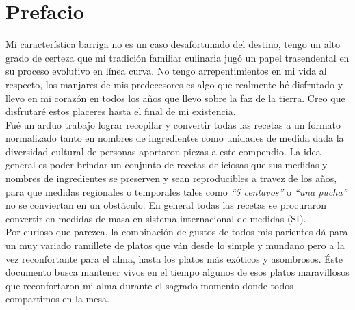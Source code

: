 \chapter{Prefacio}
Mi característica barriga no es un caso desafortunado del destino, tengo un alto grado de certeza que mi tradición familiar culinaria jugó un papel trasendental en su proceso evolutivo en línea curva. No tengo arrepentimientos en mi vida al respecto, los manjares de mis predecesores es algo que realmente hé disfrutado y llevo en mi corazón en todos los años que llevo sobre la faz de la tierra. Creo que disfrutaré estos placeres hasta el final de mi existencia.\\

Fué un arduo trabajo lograr recopilar y convertir todas las recetas a un formato normalizado tanto en nombres de ingredientes como unidades de medida dada la diversidad cultural de personas aportaron piezas a este compendio. La idea general es poder brindar un conjunto de recetas deliciosas que sus medidas y nombres de ingredientes se preserven y sean reproducibles a travez de los años, para que medidas regionales o temporales tales como \emph{``5 centavos''} o \emph{``una pucha''} no se conviertan en un obstáculo. En general todas las recetas se procuraron convertir en medidas de masa en sistema internacional de medidas (SI).\\

Por curioso que parezca, la combinación de gustos de todos mis parientes dá para un muy variado ramillete de platos que ván desde lo simple y mundano pero a la vez reconfortante para el alma, hasta los platos más exóticos y asombrosos. Éste documento busca mantener vivos en el tiempo algunos de esos platos maravillosos que reconfortaron mi alma durante el sagrado momento donde todos compartimos en la mesa.

